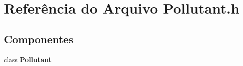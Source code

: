 \section{Referência do Arquivo Pollutant.\+h}
\label{_pollutant_8h}
\subsection*{Componentes}
\begin{DoxyCompactItemize}
\item 
class {\bf Pollutant}
\end{DoxyCompactItemize}
